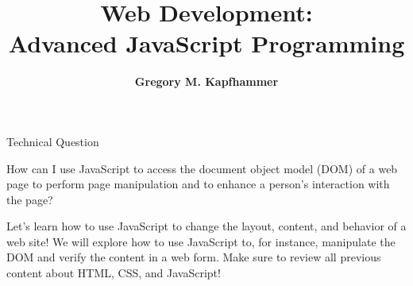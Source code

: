 \documentclass[14pt,aspectratio=169]{beamer}
\title{Web Development: \\ Advanced JavaScript Programming}
\author{{\bf Gregory M. Kapfhammer}}
\institute[shortinst]{{\bf Department of Computer Science, Allegheny College}}
\begin{document}
{
  \begin{frame}
    \titlepage
  \end{frame}
}

%
\begin{frame}{Technical Question}
  \hspace*{.25in}
  \vspace*{.2in}
  \begin{minipage}{5in}
    \begin{center}
      {\large How can I use JavaScript to access the document object model
      (DOM) of a web page to perform page manipulation and to enhance a
    person's interaction with the page?}
    \end{center}
  \end{minipage}
  \vspace{2ex}
  \begin{center}
    \small Let's learn how to use JavaScript to change the layout, content, and
    behavior of a web site! We will explore how to use JavaScript to, for
    instance, manipulate the DOM and verify the content in a web form. Make
    sure to review all previous content about HTML, CSS, and JavaScript! \\
  \end{center}
\end{frame}
\end{document}
